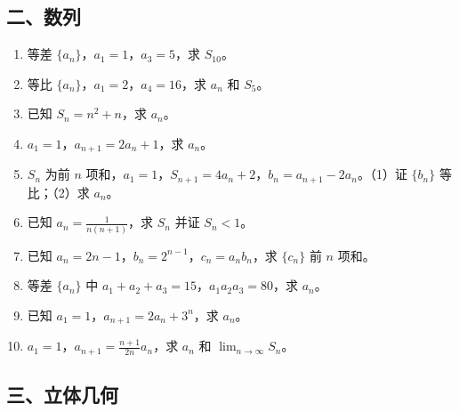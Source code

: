\subsection{二、数列}

\begin{enumerate}
  \item[★] 等差 $\{a_n\}$，$a_1=1$，$a_3=5$，求 $S_{10}$。
  \vspace{1.5cm}
  \item[★] 等比 $\{a_n\}$，$a_1=2$，$a_4=16$，求 $a_n$ 和 $S_5$。
  \vspace{1.5cm}
  \item[★] 已知 $S_n=n^2+n$，求 $a_n$。
  \vspace{1.5cm}
  \item[★★] $a_1=1$，$a_{n+1}=2a_n+1$，求 $a_n$。
  \vspace{2cm}
  \item[★★] $S_n$ 为前 $n$ 项和，$a_1=1$，$S_{n+1}=4a_n+2$，$b_n=a_{n+1}-2a_n$。（1）证 $\{b_n\}$ 等比；（2）求 $a_n$。
  \vspace{3cm}
  \item[★★] 已知 $a_n=\frac1{n(n+1)}$，求 $S_n$ 并证 $S_n<1$。
  \vspace{2cm}
  \item[★★] 已知 $a_n=2n-1$，$b_n=2^{n-1}$，$c_n=a_nb_n$，求 $\{c_n\}$ 前 $n$ 项和。
  \vspace{3cm}
  \item[★★] 等差 $\{a_n\}$ 中 $a_1+a_2+a_3=15$，$a_1a_2a_3=80$，求 $a_n$。
  \vspace{2cm}
  \item[★★★] 已知 $a_1=1$，$a_{n+1}=2a_n+3^n$，求 $a_n$。
  \vspace{2.5cm}
  \item[★★★] $a_1=1$，$a_{n+1}=\frac{n+1}{2n}a_n$，求 $a_n$ 和 $\lim_{n\to\infty} S_n$。
  \vspace{3cm}
\end{enumerate}

\subsection{三、立体几何}

